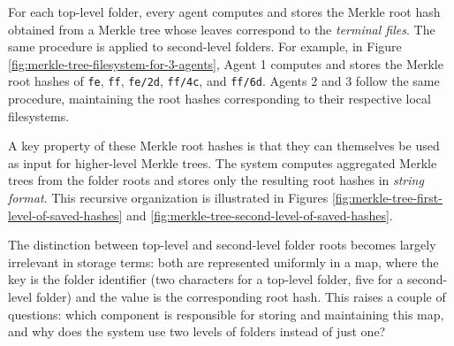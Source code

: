 For each top-level folder, every agent computes and stores the Merkle root hash obtained from a Merkle tree whose leaves correspond to the \emph{terminal files}. The same procedure is applied to second-level folders. For example, in Figure \ref{fig:merkle-tree-filesystem-for-3-agents}, Agent 1 computes and stores the Merkle root hashes of \texttt{fe}, \texttt{ff}, \texttt{fe/2d}, \texttt{ff/4c}, and \texttt{ff/6d}. Agents 2 and 3 follow the same procedure, maintaining the root hashes corresponding to their respective local filesystems.

A key property of these Merkle root hashes is that they can themselves be used as input for higher-level Merkle trees. The system computes aggregated Merkle trees from the folder roots and stores only the resulting root hashes in \textit{string format}. This recursive organization is illustrated in Figures \ref{fig:merkle-tree-first-level-of-saved-hashes} and \ref{fig:merkle-tree-second-level-of-saved-hashes}.

The distinction between top-level and second-level folder roots becomes largely irrelevant in storage terms: both are represented uniformly in a map, where the key is the folder identifier (two characters for a top-level folder, five for a second-level folder) and the value is the corresponding root hash. This raises a couple of questions: which component is responsible for storing and maintaining this map, and why does the system use two levels of folders instead of just one?

